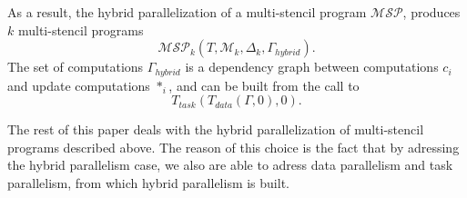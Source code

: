 As a result, the hybrid parallelization of a multi-stencil program $\mathcal{MSP}$, produces $k$ multi-stencil programs
\begin{equation*}
\mathcal{MSP}_k(T,\mathcal{M}_k,\Delta_k,\Gamma_{hybrid}).
\end{equation*}
The set of computations $\Gamma_{hybrid}$ is a dependency graph between computations $c_i$ and update computations $*_i$, and can be built from the call to 
\begin{equation*}
T_{task}(T_{data}(\Gamma,0),0).
\end{equation*}

The rest of this paper deals with the hybrid parallelization of multi-stencil programs described above. The reason of this choice is the fact that by adressing the hybrid parallelism case, we also are able to adress data parallelism and task parallelism, from which hybrid parallelism is built.

